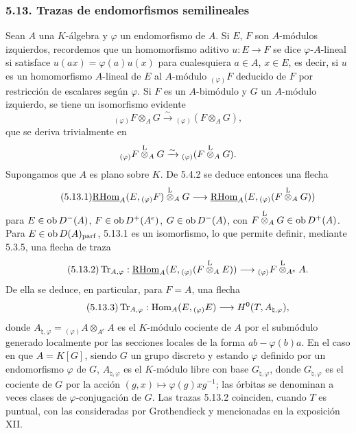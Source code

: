 \subsubsection*{5.13. Trazas de endomorfismos semilineales}

Sean $A$ una $K$-álgebra y $\varphi$ un endomorfismo de $A$. Si $E$, $F$ son $A$-módulos izquierdos, recordemos que un homomorfismo aditivo $u:E\to F$ se dice $\varphi$-$A$-lineal si satisface $u(ax)=\varphi(a)u(x)$ para cualesquiera $a\in A$, $x\in E$, es decir, si $u$ es un homomorfismo $A$-lineal de $E$ al $A$-módulo ${}_{(\varphi)}F$ deducido de $F$ por restricción de escalares según $\varphi$. Si $F$ es un $A$-bimódulo y $G$ un $A$-módulo izquierdo, se tiene un isomorfismo evidente
\[
{}_{(\varphi)}F\otimes_AG\xrightarrow{\sim}{}_{(\varphi)}(F\otimes_AG),
\]
que se deriva trivialmente en
\[
{}_{(\varphi)}F\overset{\mathrm L}{\otimes}_AG\xrightarrow{\sim}{}_{(\varphi)}(F\overset{\mathrm L}{\otimes}_AG).
\]
Supongamos que $A$ es plano sobre $K$. De 5.4.2 se deduce entonces una flecha
\begin{equation}\tag{5.13.1}
\underline{\mathrm{RHom}}_A(E,{}_{(\varphi)}F)\overset{\mathrm L}{\otimes}_AG\longrightarrow\underline{\mathrm{RHom}}_A(E,{}_{(\varphi)}(F\overset{\mathrm L}{\otimes}_AG))
\end{equation}
para $E\in\operatorname{ob} D^-(A)$, $F\in\operatorname{ob} D^+(A^e)$, $G\in\operatorname{ob} D^-(A)$, con $F\overset{\mathrm L}{\otimes}_AG\in\operatorname{ob} D^+(A)$. Para $E\in\operatorname{ob} D(A)_{\mathrm{parf}}$, 5.13.1 es un isomorfismo, lo que permite definir, mediante 5.3.5, una flecha de traza
\begin{equation}\tag{5.13.2}
\operatorname{Tr}_{A,\varphi}:\underline{\mathrm{RHom}}_A(E,{}_{(\varphi)}(F\overset{\mathrm L}{\otimes}_AE))\longrightarrow {}_{(\varphi)}F\overset{\mathrm L}{\otimes}_{A^e}A.
\end{equation}
De ella se deduce, en particular, para $F=A$, una flecha
\begin{equation}\tag{5.13.3}
\operatorname{Tr}_{A,\varphi}:\operatorname{Hom}_A(E,{}_{(\varphi)}E)\longrightarrow H^0(T,A_{\natural,\varphi}),
\end{equation}
donde $A_{\natural,\varphi}={}_{(\varphi)}A\otimes_{A^e}A$ es el $K$-módulo cociente de $A$ por el submódulo generado localmente por las secciones locales de la forma $ab-\varphi(b)a$. En el caso en que $A=K[G]$, siendo $G$ un grupo discreto y estando $\varphi$ definido por un endomorfismo $\varphi$ de $G$, $A_{\natural,\varphi}$ es el $K$-módulo libre con base $G_{\natural,\varphi}$, donde $G_{\natural,\varphi}$ es el cociente de $G$ por la acción $(g,x)\mapsto\varphi(g)xg^{-1}$; las órbitas se denominan a veces clases de $\varphi$-conjugación de $G$. Las trazas 5.13.2 coinciden, cuando $T$ es puntual, con las consideradas por Grothendieck y mencionadas en la exposición XII.
